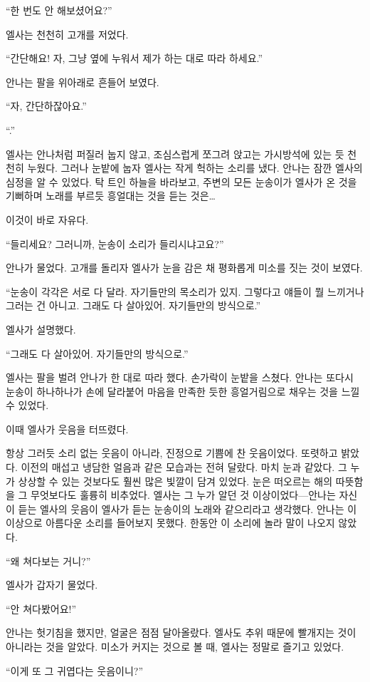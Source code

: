 ``한 번도 안 해보셨어요?''

엘사는 천천히 고개를 저었다.

``간단해요! 자, 그냥 옆에 누워서 제가 하는 대로 따라 하세요.''

안나는 팔을 위아래로 흔들어 보였다.

``자, 간단하잖아요.''

``.''

엘사는 안나처럼 퍼질러 눕지 않고, 조심스럽게 쪼그려 앉고는 가시방석에 있는 듯 천천히 누웠다. 그러나 눈밭에 눕자 엘사는 작게 헉하는 소리를 냈다. 안나는 잠깐 엘사의 심정을 알 수 있었다. 탁 트인 하늘을 바라보고, 주변의 모든 눈송이가 엘사가 온 것을 기뻐하며 노래를 부르듯 흥얼대는 것을 듣는 것은\ldots

이것이 바로 자유다.

``들리세요? 그러니까, 눈송이 소리가 들리시냐고요?''

안나가 물었다. 고개를 돌리자 엘사가 눈을 감은 채 평화롭게 미소를 짓는 것이 보였다.

``눈송이 각각은 서로 다 달라. 자기들만의 목소리가 있지. 그렇다고 얘들이 뭘 느끼거나 그러는 건 아니고. 그래도 다 살아있어. 자기들만의 방식으로.''

엘사가 설명했다.

``그래도 다 살아있어. 자기들만의 방식으로.''

엘사는 팔을 벌려 안나가 한 대로 따라 했다. 손가락이 눈밭을 스쳤다. 안나는 또다시 눈송이 하나하나가 손에 달라붙어 마음을 만족한 듯한 흥얼거림으로 채우는 것을 느낄 수 있었다.

이때 엘사가 웃음을 터뜨렸다.

항상 그러듯 소리 없는 웃음이 아니라, 진정으로 기쁨에 찬 웃음이었다. 또렷하고 밝았다. 이전의 매섭고 냉담한 얼음과 같은 모습과는 전혀 달랐다. 마치 눈과 같았다. 그 누가 상상할 수 있는 것보다도 훨씬 많은 빛깔이 담겨 있었다. 눈은 떠오르는 해의 따뜻함을 그 무엇보다도 훌륭히 비추었다. 엘사는 그 누가 알던 것 이상이었다—안나는 자신이 듣는 엘사의 웃음이 엘사가 듣는 눈송이의 노래와 같으리라고 생각했다. 안나는 이 이상으로 아름다운 소리를 들어보지 못했다. 한동안 이 소리에 놀라 말이 나오지 않았다.

``왜 쳐다보는 거니?''

엘사가 갑자기 물었다.

``안 쳐다봤어요!''

안나는 헛기침을 했지만, 얼굴은 점점 달아올랐다. 엘사도 추위 때문에 빨개지는 것이 아니라는 것을 알았다. 미소가 커지는 것으로 볼 때, 엘사는 정말로 즐기고 있었다.

``이게 또 그 귀엽다는 웃음이니?''

